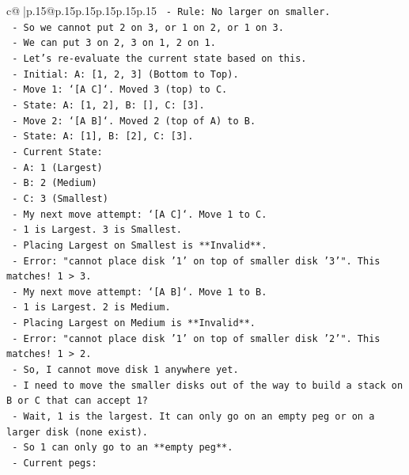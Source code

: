 \documentclass{article}
\begin{document}
{\begin{supertabular}{c@{$\;$}|p{.15\linewidth}@{}p{.15\linewidth}p{.15\linewidth}p{.15\linewidth}p{.15\linewidth}p{.15\linewidth}}
{{{\texttt{  {-} Rule: No larger on smaller.} \\
\texttt{  {-} So we cannot put 2 on 3, or 1 on 2, or 1 on 3.} \\
\texttt{  {-} We can put 3 on 2, 3 on 1, 2 on 1.} \\
\texttt{  {-} Let's re{-}evaluate the current state based on this.} \\
\texttt{  {-} Initial: A: {[}1, 2, 3{]} (Bottom to Top).} \\
\texttt{  {-} Move 1: `{[}A C{]}`. Moved 3 (top) to C.} \\
\texttt{  {-} State: A: {[}1, 2{]}, B: {[}{]}, C: {[}3{]}.} \\
\texttt{  {-} Move 2: `{[}A B{]}`. Moved 2 (top of A) to B.} \\
\texttt{  {-} State: A: {[}1{]}, B: {[}2{]}, C: {[}3{]}.} \\
\texttt{  {-} Current State:} \\
\texttt{    {-} A: 1 (Largest)} \\
\texttt{    {-} B: 2 (Medium)} \\
\texttt{    {-} C: 3 (Smallest)} \\
\texttt{  {-} My next move attempt: `{[}A C{]}`. Move 1 to C.} \\
\texttt{  {-} 1 is Largest. 3 is Smallest.} \\
\texttt{  {-} Placing Largest on Smallest is **Invalid**.} \\
\texttt{  {-} Error: "cannot place disk '1' on top of smaller disk '3'". This matches! 1 > 3.} \\
\texttt{  {-} My next move attempt: `{[}A B{]}`. Move 1 to B.} \\
\texttt{  {-} 1 is Largest. 2 is Medium.} \\
\texttt{  {-} Placing Largest on Medium is **Invalid**.} \\
\texttt{  {-} Error: "cannot place disk '1' on top of smaller disk '2'". This matches! 1 > 2.} \\
\texttt{  {-} So, I cannot move disk 1 anywhere yet.} \\
\texttt{  {-} I need to move the smaller disks out of the way to build a stack on B or C that can accept 1?} \\
\texttt{  {-} Wait, 1 is the largest. It can only go on an empty peg or on a larger disk (none exist).} \\
\texttt{  {-} So 1 can only go to an **empty peg**.} \\
\texttt{  {-} Current pegs:} \\
}}}
\end{supertabular}}
\end{document}
